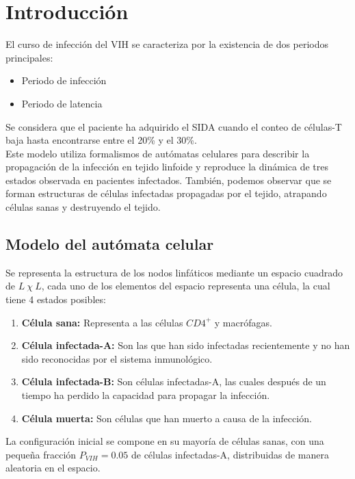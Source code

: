 \documentclass[12pt,letterpaper,oneside]{report}
\begin{document}
	
	\tableofcontents

	\chapter{Introducción}
	El curso de infección del VIH se caracteriza por la existencia de dos periodos principales:
	\begin{itemize}
		\item Periodo de infección
		\item Periodo de latencia
	\end{itemize}

	Se considera que el paciente ha adquirido el SIDA cuando el conteo de células-T baja hasta encontrarse entre el 20\% y el 30\%.\\

	Este modelo utiliza formalismos de autómatas celulares para describir la propagación de la infección en tejido linfoide y reproduce la dinámica de tres estados observada en pacientes infectados. También, podemos observar que se forman estructuras de células infectadas propagadas por el tejido, atrapando células sanas y destruyendo el tejido.\\

	\section{Modelo del autómata celular} %
	\label{sec:modelo_del_aut_mata_celular}
	Se representa la estructura de los nodos linfáticos mediante un espacio cuadrado de $L\ \chi\ L$, cada uno de los elementos del espacio representa una célula, la cual tiene 4 estados posibles:
	\begin{enumerate}
		\item \textbf{Célula sana:} Representa a las células $CD4^{+}$ y macrófagas.
		\item \textbf{Célula infectada-A:} Son las que han sido infectadas recientemente y no han sido reconocidas por el sistema inmunológico.
		\item \textbf{Célula infectada-B:} Son células infectadas-A, las cuales después de un tiempo ha perdido la capacidad para propagar la infección.
		\item \textbf{Célula muerta:} Son células que han muerto a causa de la infección.\\
	\end{enumerate}

	La configuración inicial se compone en su mayoría de células sanas, con una pequeña fracción $P_{VIH}=0.05$ de células infectadas-A, distribuidas de manera aleatoria en el espacio.
\end{document}
